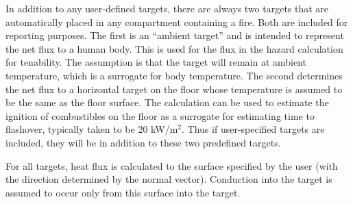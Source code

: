 In addition to any user-defined targets, there are always two targets that are automatically placed in any compartment containing a fire. Both are included for reporting purposes. The first is an “ambient target” and is intended to represent the net flux to a human body. This is used for the flux in the hazard calculation for tenability. The assumption is that the target will remain at ambient temperature, which is a surrogate for body temperature. The second determines the net flux to a horizontal target on the floor whose temperature is assumed to be the same as the floor surface. The calculation can be used to estimate the ignition of combustibles on the floor as a surrogate for estimating time to flashover, typically taken to be 20 kW/m$^2$. Thus if user-specified targets are included, they will be in addition to these two predefined targets.

For all targets, heat flux is calculated to the surface specified by the user (with the direction determined by the normal vector). Conduction into the target is assumed to occur only from this surface into the target.

